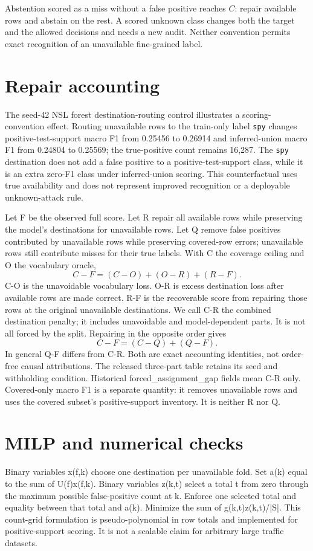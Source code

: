 \documentclass{article}
\begin{document}
Abstention scored as a miss without a false positive reaches \(C\): repair available rows and abstain on the rest. A scored unknown class changes both the target and the allowed decisions and needs a new audit. Neither convention permits exact recognition of an unavailable fine-grained label.

\section*{Repair accounting}

The seed-42 NSL forest destination-routing control illustrates a scoring-convention effect. Routing unavailable rows to the train-only label \texttt{spy} changes positive-test-support macro F1 from 0.25456 to 0.26914 and inferred-union macro F1 from 0.24804 to 0.25569; the true-positive count remains 16,287. The \texttt{spy} destination does not add a false positive to a positive-test-support class, while it is an extra zero-F1 class under inferred-union scoring. This counterfactual uses true availability and does not represent improved recognition or a deployable unknown-attack rule.

Let F be the observed full score. Let R repair all available rows while preserving the model's destinations for unavailable rows. Let Q remove false positives contributed by unavailable rows while preserving covered-row errors; unavailable rows still contribute misses for their true labels. With C the coverage ceiling and O the vocabulary oracle,
\[
C-F=(C-O)+(O-R)+(R-F).
\]
C-O is the unavoidable vocabulary loss. O-R is excess destination loss after available rows are made correct. R-F is the recoverable score from repairing those rows at the original unavailable destinations. We call C-R the combined destination penalty; it includes unavoidable and model-dependent parts. It is not all forced by the split. Repairing in the opposite order gives
\[
C-F=(C-Q)+(Q-F).
\]
In general Q-F differs from C-R. Both are exact accounting identities, not order-free causal attributions. The released three-part table retains its seed and withholding condition. Historical forced\_assignment\_gap fields mean C-R only. Covered-only macro F1 is a separate quantity: it removes unavailable rows and uses the covered subset's positive-support inventory. It is neither R nor Q.

\section*{MILP and numerical checks}
Binary variables x(f,k) choose one destination per unavailable fold. Set a(k) equal to the sum of U(f)x(f,k). Binary variables z(k,t) select a total t from zero through the maximum possible false-positive count at k. Enforce one selected total and equality between that total and a(k). Minimize the sum of g(k,t)z(k,t)/|S|. This count-grid formulation is pseudo-polynomial in row totals and implemented for positive-support scoring. It is not a scalable claim for arbitrary large traffic datasets.
\end{document}
